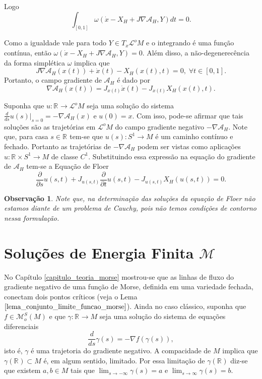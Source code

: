 \documentclass[12pt]{book}
\newtheorem{observacao}[teorema]{Observação}
\newcommand{\campohamiltoniano}[1]{X_{H}(#1)}
\newcommand{\campohamiltonianoabrev}{X_{H}}
\newcommand{\circulo}{S^{1}}
\newcommand{\derivada}[2]{\frac{d #1}{d #2}}
\newcommand{\derivadaparcial}[2]{\frac{\partial #1}{\partial #2}}
\newcommand{\energiafinitaM}{\mathcal{M}}
\newcommand{\espacotangenteponto}[2]{T_{#1}#2}
\newcommand{\funcionalH}{\mathcal{A}_{H}}
\newcommand{\funcoesmorsesmale}[1]{\mathcal{M}^{S}_{o}(#1)}
\newcommand{\gradiente}{\nabla f}
\newcommand{\gradientefuncional}{\nabla \funcionalH}
\newcommand{\intervalo}{[0,1]}
\newcommand{\operadorFloerDefinicao}[1]{\derivadaparcial{}{s}#1 + J_{#1}\derivadaparcial{}{t}#1 - J_{#1}X_{H}(#1)}
\newcommand{\retacartesianocirculo}{\real{} \times \circulo}
\newcommand{\real}[1]{\mathbb{R}^{#1}}
\newcommand{\reta}{\real{}}
\newcommand{\lacocontrateis}{\mathcal{L}^{o}M}
\begin{document}
	Logo
	$$
	\int_{[0,1]} \omega(\dot{x} - \campohamiltonianoabrev + J\gradientefuncional, Y)dt = 0.
	$$
	
	Como a igualdade vale para todo $Y \in \espacotangenteponto{x}{\lacocontrateis}$ e o integrando é uma função contínua, então $\omega(\dot{x} - \campohamiltonianoabrev + J\gradientefuncional, Y)=0$. Além disso, a não-degenerecência da forma simplética $\omega$ implica que
	$$
	J\gradientefuncional(x(t)) +\dot{x}(t)-\campohamiltoniano{x(t), t} = 0, \; \forall t \in \intervalo.
	$$
	Portanto, o campo gradiente de $\funcionalH$ é dado por
	$$
	\gradientefuncional(x(t))= J_{x(t)}\dot{x}(t)-J_{x(t)}\campohamiltoniano{x(t), t}.
	$$
	
	Suponha que $u :\reta\to \lacocontrateis$ seja uma solução do sistema $\derivada{}{s}u(s)|_{s=0} = -\gradientefuncional(x)$ e $u(0)=x$. Com isso, pode-se afirmar que tais soluções são as trajetórias em $\lacocontrateis$ do campo gradiente negativo $-\gradientefuncional$. Note que, para casa $s\in \reta$ tem-se que $u(s):\circulo\to M$ é um caminho contínuo e fechado. Portanto as trajetórias de $-\gradientefuncional$ podem ser vistas como aplicações $u:\retacartesianocirculo \to M$ de classe $C^{1}$. Substituindo essa expressão na equação do gradiente de $\funcionalH$ tem-se a Equação de Floer
	$$
	\operadorFloerDefinicao{u(s,t)}=0.
	$$

	\begin{observacao}
		Note que, na determinação das soluções da equação de Floer não estamos diante de um problema de Cauchy, pois não temos condições de contorno nessa formulação.
	\end{observacao}
	
	\section{Soluções de Energia Finita $\energiafinitaM$}\label{secao_funcional_energia}
	
	No Capítulo \ref{capitulo_teoria_morse} mostrou-se que as linhas de fluxo do gradiente negativo de uma função de Morse, definida em uma variedade fechada, conectam dois pontos críticos (veja o Lema $\ref{lema_conjunto_limite_funcao_morse}$). Ainda no caso clássico, suponha que $f \in \funcoesmorsesmale{M}$ e que $\gamma:\reta \to M$ seja uma solução do sistema de equações diferenciais
	$$
	\derivada{}{s}\gamma(s)=-\gradiente(\gamma(s)),
	$$
	isto é, $\gamma$ é uma trajetoria do gradiente negativo. A compacidade de $M$ implica que $\gamma(\reta) \subset M$ é, em algum sentido, limitado. Por essa limitação de $\gamma(\reta)$ diz-se que existem $a, b \in M$ tais que $\lim_{s\to -\infty}\gamma(s)=a$ e $\lim_{s\to \infty}\gamma(s)=b$. 
	
\end{document}

